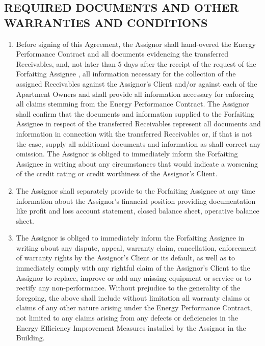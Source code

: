 \documentclass[a4paper]{article}
\begin{document}
\begin{multicols}{2}

  \subsection{REQUIRED DOCUMENTS AND OTHER WARRANTIES AND CONDITIONS}

  \begin{enumerate}
  \item{Before signing of this Agreement, the Assignor shall hand{-}overed
      the Energy Performance Contract and all documents evidencing the
      transferred Receivables, and, not later than 5 days after the
      receipt of the request of the Forfaiting Assignee , all
      information necessary for the collection of the assigned
      Receivables against the Assignor’s Client and/or against each of
      the Apartment Owners and shall provide all information necessary
      for enforcing all claims stemming from the Energy Performance
      Contract. The Assignor shall confirm that the documents and
      information supplied to the Forfaiting Assignee in respect of
      the transferred Receivables represent all documents and
      information in connection with the transferred Receivables or,
      if that is not the case, supply all additional documents and
      information as shall correct any omission. The Assignor is
      obliged to immediately inform the Forfaiting Assignee in writing
      about any circumstances that would indicate a worsening of the
      credit rating or credit worthiness of the Assignor’s Client.}

  \item{The Assignor shall separately provide to the Forfaiting
      Assignee at any time information about the Assignor’s financial
      position providing documentation like profit and loss account
      statement, closed balance sheet, operative balance sheet.}

  \item{The Assignor is obliged to immediately inform the Forfaiting
      Assignee in writing about any dispute, appeal, warranty claim,
      cancellation, enforcement of warranty rights by the Assignor’s
      Client or its default, as well as to immediately comply with any
      rightful claim of the Assignor’s Client to the Assignor to
      replace, improve or add any missing equipment or service or to
      rectify any non{-}performance. Without prejudice to the
      generality of the foregoing, the above shall include without
      limitation all warranty claims or claims of any other nature
      arising under the Energy Performance Contract, not limited to
      any claims arising from any defects or deficiencies in the
      Energy Efficiency Improvement Measures installed by the Assignor
      in the Building.}


\end{enumerate}
\end{multicols}
\end{document}
